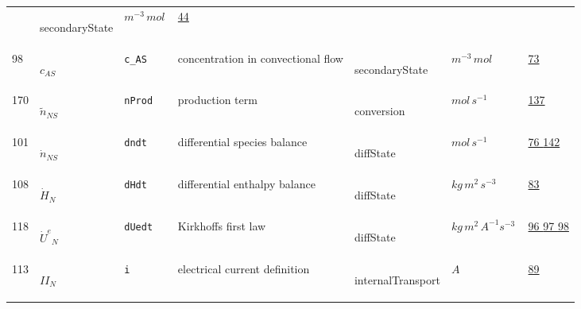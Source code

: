 \begin{longtable}{|p{1cm}|p{2.5cm}|p{4.5cm}|p{8cm}|p{3.0cm}|p{3cm}|p{1cm}|}
             & \begin{lay}secondaryState \end{lay}
             & $ m^{-3} \,mol \, $
             &                 \hyperlink{"e:44"}{ 44 }
                 \\
            98
             & \hypertarget{"v:98"}{ $ {c}{_{{A S}}} $}
             & \verb|c_AS|
             & concentration in convectional flow
             & \begin{lay}secondaryState \end{lay}
             & $ m^{-3} \,mol \, $
             &                 \hyperlink{"e:73"}{ 73 }
                 \\
            170
             & \hypertarget{"v:170"}{ $ {{\tilde n}}{_{{N S}}} $}
             & \verb|nProd|
             & production term
             & \begin{lay}conversion \end{lay}
             & $ mol \,s^{-1} \, $
             &                 \hyperlink{"e:137"}{ 137 }
                 \\
            101
             & \hypertarget{"v:101"}{ $ {\dot{n}}{_{{N S}}} $}
             & \verb|dndt|
             & differential species balance
             & \begin{lay}diffState \end{lay}
             & $ mol \,s^{-1} \, $
             &                 \hyperlink{"e:76"}{ 76 }
                                 \hyperlink{"e:142"}{ 142 }
                 \\
            108
             & \hypertarget{"v:108"}{ $ {{\dot{H}}}{_{N}} $}
             & \verb|dHdt|
             & differential enthalpy balance
             & \begin{lay}diffState \end{lay}
             & $ kg \,m^{2} \,s^{-3} \, $
             &                 \hyperlink{"e:83"}{ 83 }
                 \\
            118
             & \hypertarget{"v:118"}{ $ {{\dot{U}^e}}{_{N}} $}
             & \verb|dUedt|
             & Kirkhoffs first law
             & \begin{lay}diffState \end{lay}
             & $ kg \,m^{2} \,A^{-1} s^{-3} \, $
             &                 \hyperlink{"e:96"}{ 96 }
                                 \hyperlink{"e:97"}{ 97 }
                                 \hyperlink{"e:98"}{ 98 }
                 \\
            113
             & \hypertarget{"v:113"}{ $ {II}{_{N}} $}
             & \verb|i|
             & electrical current definition
             & \begin{lay}internalTransport \end{lay}
             & $ A \, $
             &                 \hyperlink{"e:89"}{ 89 }
                 \\
    \end{longtable}